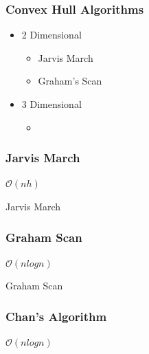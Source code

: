 \documentclass{beamer}
\begin{document}
    \begin{frame}
      \frametitle{Convex Hull Algorithms}
      \begin{itemize}
        \item 2 Dimensional
        \begin{itemize}
          \item Jarvis March
          \item Graham's Scan
        \end{itemize}
        \item 3 Dimensional 
        \begin{itemize}
          \item 
        \end{itemize}
      \end{itemize}
    \end{frame}
    
    \begin{frame}
      \frametitle{Jarvis March}
      
    \begin{center}
      $\mathcal{O}(nh)$
    \end{center}
  \end{frame}
  
  \begin{frame}{Jarvis March}
  \end{frame}
  
  
  \begin{frame}
    \frametitle{Graham Scan}
    
    \begin{center}
      
      $\mathcal{O}(n log n)$
    \end{center}
  \end{frame}
  
  \begin{frame}{Graham Scan}
    \end{frame}
    
    
    \begin{frame}
      \frametitle{Chan's Algorithm}
      
      \begin{center}
        $\mathcal{O}(n log n)$
      \end{center}
    \end{frame}
    
\end{document}

